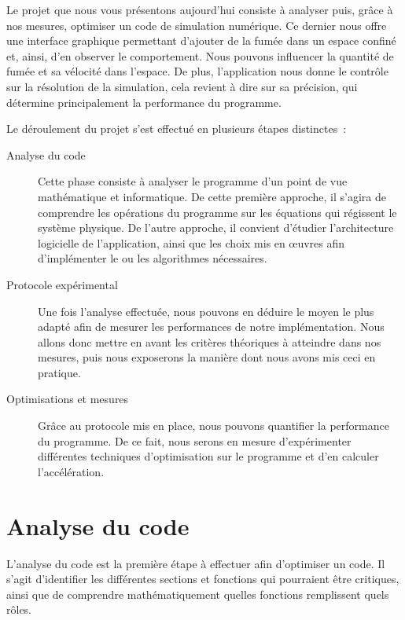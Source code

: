 \documentclass[12pt,a4paper]{article}
\begin{document}
Le projet que nous vous présentons aujourd'hui consiste à analyser puis,
grâce à nos mesures, optimiser un code de simulation numérique. Ce dernier
nous offre une interface graphique permettant d'ajouter de la fumée dans un
espace confiné et, ainsi, d'en observer le comportement. Nous pouvons
influencer la quantité de fumée et sa vélocité dans l'espace. De plus,
l'application nous donne le contrôle sur la résolution de la simulation,
cela revient à dire sur sa précision, qui détermine principalement la
performance du programme.

Le déroulement du projet s'est effectué en plusieurs étapes distinctes :
\begin{description}
    \item[Analyse du code] Cette phase consiste à analyser le programme
        d'un point de vue mathématique et informatique. De cette première
        approche, il s'agira de comprendre les opérations du programme sur
        les équations qui régissent le système physique. De l'autre
        approche, il convient d'étudier l'architecture logicielle de
        l'application, ainsi que les choix mis en œuvres afin d'implémenter
        le ou les algorithmes nécessaires.
    \item[Protocole expérimental] Une fois l'analyse effectuée, nous
        pouvons en déduire le moyen le plus adapté afin de mesurer les
        performances de notre implémentation. Nous allons donc mettre en
        avant les critères théoriques à atteindre dans nos mesures, puis
        nous exposerons la manière dont nous avons mis ceci en pratique.
    \item[Optimisations et mesures] Grâce au protocole mis en place, nous
        pouvons quantifier la performance du programme. De ce fait, nous serons
        en mesure d'expérimenter différentes techniques d'optimisation sur le
        programme et d'en calculer l'accélération.
\end{description}

\section{Analyse du code}
\label{sec.analyze}


L'analyse du code est la première étape à effectuer afin d'optimiser un code. Il
s'agit d'identifier les différentes sections et fonctions qui pourraient être
critiques, ainsi que de comprendre mathématiquement quelles fonctions
remplissent quels rôles.
\end{document}
